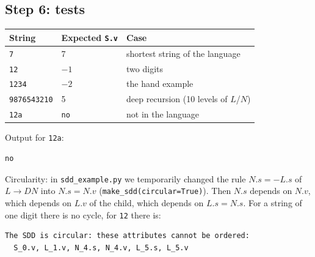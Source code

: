\documentclass[11pt]{article}
\begin{document}
\subsection{Step 6: tests}
\begin{center}
\begin{tabular}{lll}
\toprule
String & Expected \texttt{S.v} & Case\\
\midrule
\texttt{7} & 7 & shortest string of the language\\
\texttt{12} & $-1$ & two digits\\
\texttt{1234} & $-2$ & the hand example\\
\texttt{9876543210} & 5 & deep recursion (10 levels of $L$/$N$)\\
\texttt{12a} & \texttt{no} & not in the language\\
\bottomrule
\end{tabular}
\end{center}
Output for \texttt{12a}:
\begin{verbatim}
no
\end{verbatim}

Circularity: in \texttt{sdd\_example.py} we temporarily changed the rule $N.s=-L.s$ of $L\to DN$ into $N.s=N.v$
(\texttt{make\_sdd(circular=True)}). Then $N.s$ depends on $N.v$, which depends on $L.v$ of the child, which depends on $L.s=N.s$.
For a string of one digit there is no cycle, for \texttt{12} there is:
\begin{verbatim}
The SDD is circular: these attributes cannot be ordered:
  S_0.v, L_1.v, N_4.s, N_4.v, L_5.s, L_5.v
\end{verbatim}
\end{document}
